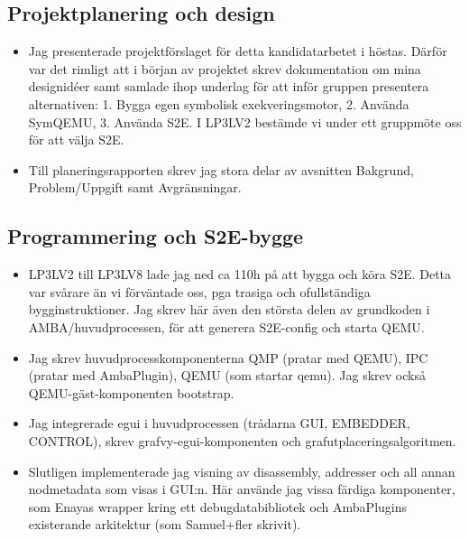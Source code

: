\subsection*{Projektplanering och design}

\begin{itemize}

	\item Jag presenterade projektförslaget för detta kandidatarbetet i höstas. Därför var det
	      rimligt att i början av projektet skrev dokumentation om mina designidéer samt samlade ihop
	      underlag för att inför gruppen presentera alternativen: 1. Bygga egen symbolisk
	      exekveringsmotor, 2. Använda SymQEMU, 3. Använda S2E. I LP3LV2 bestämde vi under ett gruppmöte
	      oss för att välja S2E.

	\item Till planeringsrapporten skrev jag stora delar av avsnitten Bakgrund, Problem/Uppgift samt
	      Avgränsningar.

\end{itemize}

\subsection*{Programmering och S2E-bygge}

\begin{itemize}

	\item LP3LV2 till LP3LV8 lade jag ned ca 110h på att bygga och köra S2E. Detta var svårare än vi
	      förväntade oss, pga trasiga och ofullständiga bygginstruktioner. Jag skrev här även den största
	      delen av grundkoden i AMBA/huvudprocessen, för att generera S2E-config och starta QEMU.\@

	\item Jag skrev huvudprocesskomponenterna QMP (pratar med QEMU), IPC (pratar med
	      AmbaPlugin), QEMU (som startar qemu). Jag skrev också QEMU-gäst-komponenten bootstrap.

	\item Jag integrerade egui i huvudprocessen (trådarna GUI, EMBEDDER, CONTROL), skrev
	      grafvy-egui-komponenten och grafutplaceringsalgoritmen.

	\item Slutligen implementerade jag visning av disassembly, addresser och all annan nodmetadata
	      som visas i GUI:n. Här använde jag vissa färdiga komponenter, som Enayas wrapper kring ett
	      debugdatabibliotek och AmbaPlugins existerande arkitektur (som Samuel+fler skrivit).

\end{itemize}

